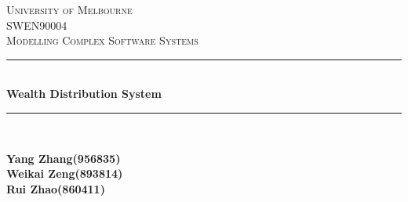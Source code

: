 \begin{titlepage}

\newcommand{\HRule}{\rule{\linewidth}{0.5mm}} %

\center %
 

\textsc{\LARGE University of Melbourne}\\[1.5cm] %
\textsc{\Large SWEN90004}\\[0.5cm] %
\textsc{\large Modelling Complex Software Systems}\\[0.5cm] %


\HRule \\[0.4cm]
{ \huge \bfseries Wealth Distribution System}\\[0.4cm] %
\HRule \\[1.5cm]


\begin{minipage}{0.4\textwidth}
	\bfseries     Yang Zhang(956835)\\
	\bfseries     Weikai Zeng(893814) \\
	\bfseries     Rui Zhao(860411)\\
\end{minipage}\\[2cm]




\end{titlepage}
